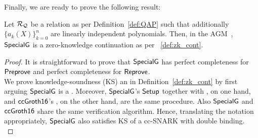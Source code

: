 \noindent Finally, we are ready to prove the following result:

\begin{theorem}
\label{sec_specialg}
Let $\mathcal{R}_{\mathcal{Q}}$ be a relation as per Definition~\ref{def:QAP} such that additionally $\{a_k(X)\}_{k=0}^n$ are linearly independent polynomials. Then, in the 
AGM~\cite{Fuchs_AGM}, ${\mathsf{SpecialG}}$ is a zero-knowledge continuation as per ~\ref{def:zk_cont}. 
\end{theorem}
\begin{proof} It is straightforward to prove that ${\mathsf{SpecialG}}$ has perfect completeness for ${\mathsf{Preprove}}$ and perfect completeness 
for ${\mathsf{Reprove}}$. \\

\noindent We prove knowledge-soundness (KS) an in Definition~\ref{def:zk_cont} by first arguing ${\mathsf{SpecialG}}$ is a 
. 
 Moreover, 
${\mathsf{SpecialG}}$'s ${\mathsf{Setup}}$ together with , on one hand, and ${\mathsf{ccGroth16}}$'s , on the other hand, are the same procedure. Also ${\mathsf{SpecialG}}$ 
and ${\mathsf{ccGroth16}}$ share the same verification algorithm. Hence, translating the notation appropriately, ${\mathsf{SpecialG}}$ also satisfies KS 
of a cc-SNARK with double binding. \\


\end{proof}
